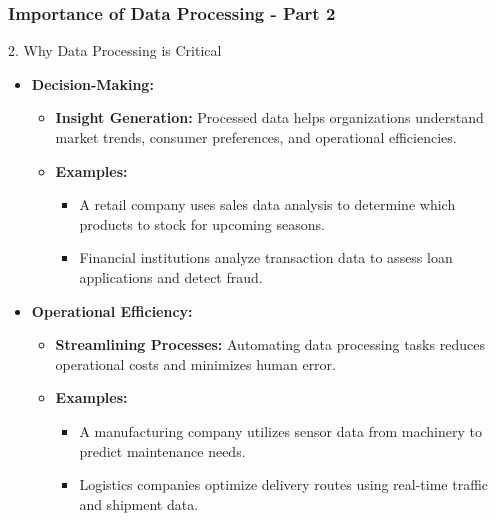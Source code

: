 \documentclass[aspectratio=169]{beamer}
\begin{document}
\begin{frame}[fragile]
    \frametitle{Importance of Data Processing - Part 2}
    \begin{block}{2. Why Data Processing is Critical}
        \begin{itemize}
            \item \textbf{Decision-Making:}
            \begin{itemize}
                \item \textbf{Insight Generation:} Processed data helps organizations understand market trends, consumer preferences, and operational efficiencies.
                \item \textbf{Examples:}
                \begin{itemize}
                    \item A retail company uses sales data analysis to determine which products to stock for upcoming seasons.
                    \item Financial institutions analyze transaction data to assess loan applications and detect fraud.
                \end{itemize}
            \end{itemize}

            \item \textbf{Operational Efficiency:}
            \begin{itemize}
                \item \textbf{Streamlining Processes:} Automating data processing tasks reduces operational costs and minimizes human error.
                \item \textbf{Examples:}
                \begin{itemize}
                    \item A manufacturing company utilizes sensor data from machinery to predict maintenance needs.
                    \item Logistics companies optimize delivery routes using real-time traffic and shipment data.
                \end{itemize}
            \end{itemize}
        \end{itemize}
    \end{block}
\end{frame}
\end{document}
